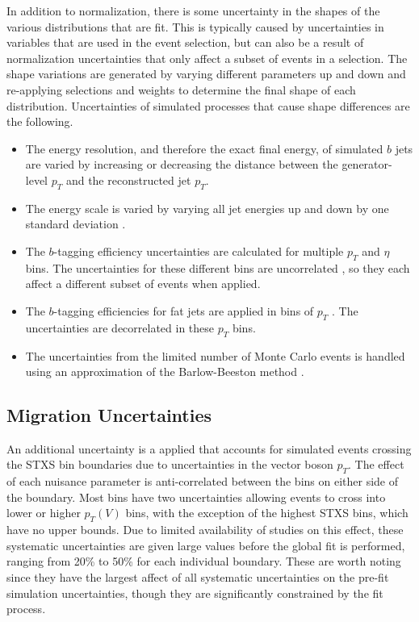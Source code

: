 In addition to normalization, there is some uncertainty in the shapes of the various distributions that are fit.
This is typically caused by uncertainties in variables that are used in the event selection,
but can also be a result of normalization uncertainties that only affect a subset of events in a selection.
The shape variations are generated by varying different parameters up and down
and re-applying selections and weights to determine the final shape of each distribution.
Uncertainties of simulated processes that cause shape differences are the following.
\begin{itemize}
\item The energy resolution, and therefore the exact final energy,
  of simulated $b$ jets are varied by increasing or decreasing
  the distance between the generator-level $p_T$ and the reconstructed jet $p_T$.
\item The energy scale is varied by varying all jet energies up and down by
  one standard deviation \cite{Khachatryan_2017}.
\item The $b$-tagging efficiency uncertainties are calculated
  for multiple $p_T$ and $\eta$ bins.
  The uncertainties for these different bins are uncorrelated \cite{btagsys},
  so they each affect a different subset of events when applied.
\item The $b$-tagging efficiencies for fat jets are applied in bins of $p_T$ \cite{CMS-DP-2018-046}.
  The uncertainties are decorrelated in these $p_T$ bins.
\item The uncertainties from the limited number of Monte Carlo events is handled
  using an approximation of the Barlow-Beeston method \cite{BARLOW1993219}.
\end{itemize}

\subsection{Migration Uncertainties} \label{sec:pT-mig}

An additional uncertainty is a applied that accounts for simulated events crossing the STXS bin boundaries
due to uncertainties in the vector boson $p_T$.
The effect of each nuisance parameter is anti-correlated between the bins on either side of the boundary.
Most bins have two uncertainties allowing events to cross into lower or higher $p_T(V)$ bins,
with the exception of the highest STXS bins, which have no upper bounds.
Due to limited availability of studies on this effect,
these systematic uncertainties are given large values before the global fit is performed,
ranging from 20\% to 50\% for each individual boundary.
These are worth noting since they have the largest affect of all systematic uncertainties
on the pre-fit simulation uncertainties,
though they are significantly constrained by the fit process.
